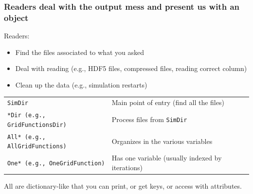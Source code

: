 \documentclass[compress, aspectratio=169]{beamer}
\begin{document}
\begin{frame}
  \frametitle{Readers deal with the output mess and present us with an object }
  Readers:
  \begin{itemize}
    \item Find the files associated to what you asked
    \item Deal with reading (e.g., HDF5 files, compressed files, reading correct column)
    \item Clean up the data (e.g., simulation restarts)
  \end{itemize}
  \begin{table}[htbp]
    \centering
    \begin{tabular}[t]{ll}
      \texttt{SimDir} & Main point of entry  (find all the files)\\
  \texttt{*Dir (e.g., GridFunctionsDir)} & Process files from \texttt{SimDir} \\
  \texttt{All* (e.g., AllGridFunctions)} & Organizes in the various variables \\
  \texttt{One* (e.g., OneGridFunction)} & Has one variable (usually indexed by iterations) \\
    \end{tabular}
  \end{table}

  All are dictionary-like that you can print, or get keys, or access with attributes.
\end{frame}
\end{document}
